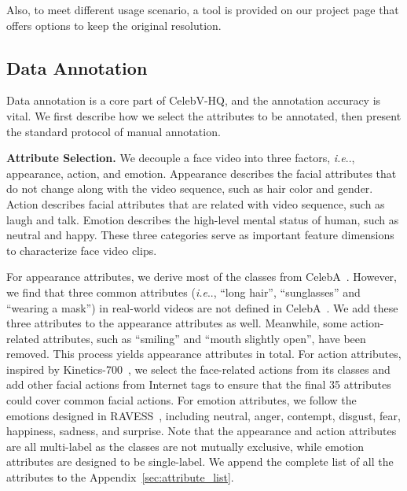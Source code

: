 \documentclass[runningheads]{llncs}
\makeatletter
\DeclareRobustCommand\onedot{\futurelet\@let@token\@onedot}
\def\@onedot{\ifx\@let@token.\else.\null\fi\xspace}
\def\ie{\emph{i.e}\onedot} \def\Ie{\emph{I.e}\onedot}
\makeatother
\begin{document}
Also, to meet different usage scenario, a tool is provided on our project page that offers options to keep the original resolution.






\subsection{Data Annotation}
Data annotation is a core part of CelebV-HQ, and the annotation accuracy is vital. We first describe how we select the attributes to be annotated, then present the standard protocol of manual annotation.


\noindent
\textbf{Attribute Selection.} We decouple a face video into three factors, \ie,  appearance, action, and emotion. Appearance describes the facial attributes that do not change along with the video sequence, such as hair color and gender. Action describes facial attributes that are related with video sequence, such as laugh and talk. Emotion describes the high-level mental status of human, such as neutral and happy.
These three categories serve as important feature dimensions to characterize face video clips.


For appearance attributes, we derive most of the classes from CelebA~\cite{celeba15}. However, we find that three common attributes (\ie, ``long hair'', ``sunglasses'' and ``wearing a mask'') in real-world videos are not defined in CelebA~\cite{celeba15}. We add these three attributes to the appearance attributes as well.
Meanwhile, some action-related attributes, such as ``smiling'' and ``mouth slightly open'', have been removed. This process yields  appearance attributes in total.
For action attributes, inspired by Kinetics-700~\cite{kinetics700}, we select the face-related actions from its classes and add other facial actions from Internet tags to ensure that the final 35 attributes could cover common facial actions. For emotion attributes, we follow the  emotions designed in RAVESS~\cite{RAVDESS}, including neutral, anger, contempt, disgust, fear, happiness, sadness, and surprise. Note that the appearance and action attributes are all multi-label as the classes are not mutually exclusive, while emotion attributes are designed to be single-label. We append the complete list of all the attributes to the Appendix~\ref{sec:attribute_list}.
\end{document}
